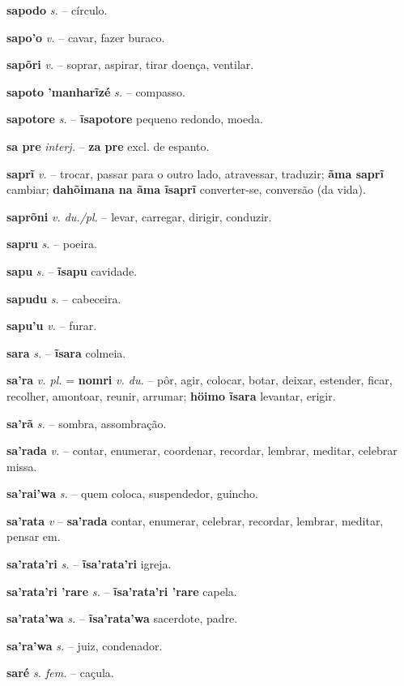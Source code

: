 \textbf{sapodo} \textit{s.} -- círculo.

\textbf{sapo'o} \textit{v.} -- cavar, fazer buraco.

\textbf{sapõri} \textit{v.} -- soprar, aspirar, tirar doença, ventilar.

\textbf{sapoto 'manharĩzé} \textit{s.} -- compasso.

\textbf{sapotore} \textit{s.} -- \textbf{ĩsapotore} pequeno redondo, moeda.

\textbf{sa pre} \textit{interj.} -- \textbf{za pre} excl. de espanto.

\textbf{saprĩ} \textit{v.} -- trocar, passar para o outro lado, atravessar, traduzir; \textbf{ãma saprĩ} cambiar; \textbf{dahõimana na ãma ĩsaprĩ} converter-se, conversão (da vida).

\textbf{saprõni} \textit{v. du./pl.} -- levar, carregar, dirigir, conduzir.

\textbf{sapru} \textit{s.} -- poeira.

\textbf{sapu} \textit{s.} -- \textbf{ĩsapu} cavidade.

\textbf{sapudu} \textit{s.} -- cabeceira.

\textbf{sapu'u} \textit{v.} -- furar.

\textbf{sara} \textit{s.} -- \textbf{ĩsara} colmeia.

\textbf{sa'ra} \textit{v. pl.} = \textbf{nomri} \textit{v. du.} -- pôr, agir, colocar, botar, deixar, estender, ficar, recolher, amontoar, reunir, arrumar; \textbf{höimo ĩsara} levantar, erigir.

\textbf{sa'rã} \textit{s.} -- sombra, assombração.

\textbf{sa'rada} \textit{v.} -- contar, enumerar, coordenar, recordar, lembrar, meditar, celebrar missa.

\textbf{sa'rai'wa} \textit{s.} -- quem coloca, suspendedor, guincho.

\textbf{sa'rata} \textit{v} -- \textbf{sa'rada} contar, enumerar, celebrar, recordar, lembrar, meditar, pensar em.

\textbf{sa'rata'ri} \textit{s.} -- \textbf{ĩsa'rata'ri} igreja.

\textbf{sa'rata'ri 'rare} \textit{s.} -- \textbf{ĩsa'rata'ri 'rare} capela.

\textbf{sa'rata'wa} \textit{s.} -- \textbf{ĩsa'rata'wa} sacerdote, padre.

\textbf{sa'ra'wa} \textit{s.} -- juiz, condenador.

\textbf{saré} \textit{s. fem.} -- caçula.

